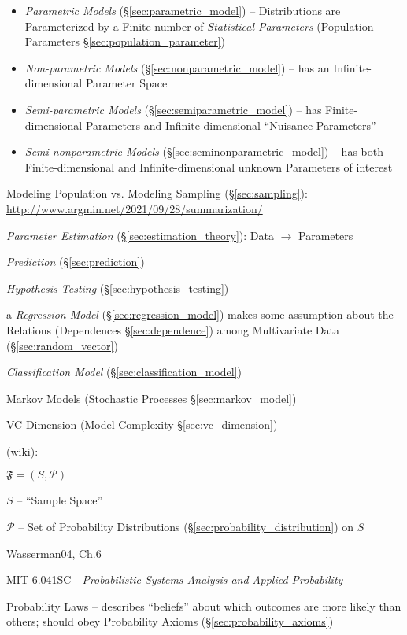 \begin{itemize}
  \item \emph{Parametric Models} (\S\ref{sec:parametric_model}) -- Distributions
    are Parameterized by a Finite number of \emph{Statistical Parameters}
    (Population Parameters \S\ref{sec:population_parameter})
  \item \emph{Non-parametric Models} (\S\ref{sec:nonparametric_model})
    -- has an Infinite-dimensional Parameter Space
  \item \emph{Semi-parametric Models} (\S\ref{sec:semiparametric_model}) -- has
    Finite-dimensional Parameters and Infinite-dimensional
    ``Nuisance Parameters''
  \item \emph{Semi-nonparametric Models} (\S\ref{sec:seminonparametric_model})
    -- has both Finite-dimensional and Infinite-dimensional unknown Parameters
    of interest
\end{itemize}

\fist Modeling Population vs. Modeling Sampling (\S\ref{sec:sampling}):
\url{http://www.argmin.net/2021/09/28/summarization/}

\emph{Parameter Estimation} (\S\ref{sec:estimation_theory}): Data $\to$
Parameters

\emph{Prediction} (\S\ref{sec:prediction})

\emph{Hypothesis Testing} (\S\ref{sec:hypothesis_testing})

\fist a \emph{Regression Model} (\S\ref{sec:regression_model}) makes some
assumption about the Relations (Dependences \S\ref{sec:dependence}) among
Multivariate Data (\S\ref{sec:random_vector})

\fist \emph{Classification Model} (\S\ref{sec:classification_model})

\fist Markov Models (Stochastic Processes \S\ref{sec:markov_model})

VC Dimension (Model Complexity \S\ref{sec:vc_dimension})

(wiki):

$\mathfrak{F} = (S, \mathcal{P})$

$S$ -- ``Sample Space''

$\mathcal{P}$ -- Set of Probability Distributions
(\S\ref{sec:probability_distribution}) on $S$

Wasserman04, Ch.6

\asterism

MIT 6.041SC - \emph{Probabilistic Systems Analysis and Applied Probability}

Probability Laws -- describes ``beliefs'' about which outcomes are more likely
than others; should obey Probability Axioms (\S\ref{sec:probability_axioms})

